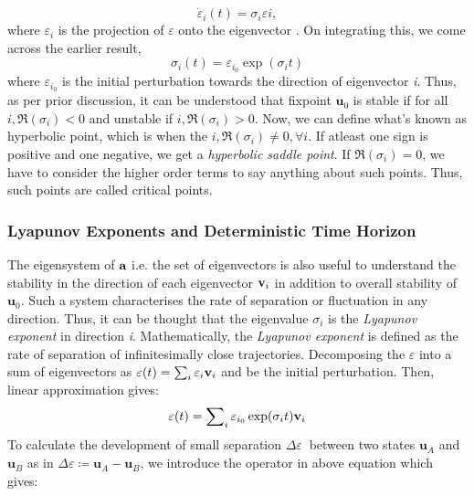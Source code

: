 \begin{equation}
\dot{\varepsilon}_{i}(t)= \sigma_{i}\varepsilon{i},
\end{equation}
where $ \varepsilon_{i} $ is the projection of $ \varepsilon $ onto the eigenvector . On integrating this, we come across the earlier result,
\begin{equation}
\sigma_{i}(t) = \varepsilon_{i_{0}}\exp(\sigma_{i}t)
\end{equation}
where $ \varepsilon_{i_{0}} $ is the initial perturbation towards the direction of eigenvector \textit{i}. Thus, as per prior discussion, it can be understood that fixpoint $\textbf{u}_{0}$ is stable if for all $ i, \Re(\sigma_{i}) < 0 $   and unstable if $ i, \Re(\sigma_{i}) > 0 $. Now, we can define what’s known as hyperbolic point, which is when the $ i, \Re(\sigma_{i}) \neq 0,\forall i $. If atleast one sign is positive and one negative, we get a \textit{hyperbolic saddle point}. If $ \Re(\sigma_{i}) = 0 $, we have to consider the higher order terms to say anything about such points. Thus, such points are called critical points.

\subsubsection*{Lyapunov Exponents and Deterministic Time Horizon}
The eigensystem of $\normalfont \textbf{a}$ i.e. the set of eigenvectors is also useful to understand the stability in the direction of each eigenvector $ \normalfont \textbf{v}_{i} $ in addition to overall stability of $\textbf{u}_{0}$. Such a system characterises the rate of separation or fluctuation in any direction. Thus, it can be thought that the eigenvalue $ \sigma_{i} $ is the \textit{Lyapunov exponent} in direction \textit{i}. Mathematically, the \textit{Lyapunov exponent} is defined as the rate of separation of infinitesimally close trajectories. Decomposing the $ \varepsilon $ into a sum of eigenvectors as $ \varepsilon(t) = \sum\nolimits_{i} \varepsilon_{i}\normalfont \textbf{v}_{i} $ and  be the initial perturbation. Then, linear approximation gives:
\begin{equation}
\varepsilon(t) = \sum\nolimits_{i} \varepsilon_{i_{0}}\exp(\sigma_{i}t)\normalfont \textbf{v}_{i}
\end{equation}
To calculate the development of small separation $ \Delta\varepsilon\ $ between two states $\textbf{u}_{A}$ and $\textbf{u}_{B}$ as in $ \Delta\varepsilon\coloneqq \textbf{u}_{A} -\textbf{u}_{B} $, we introduce the  operator in above equation which gives:

